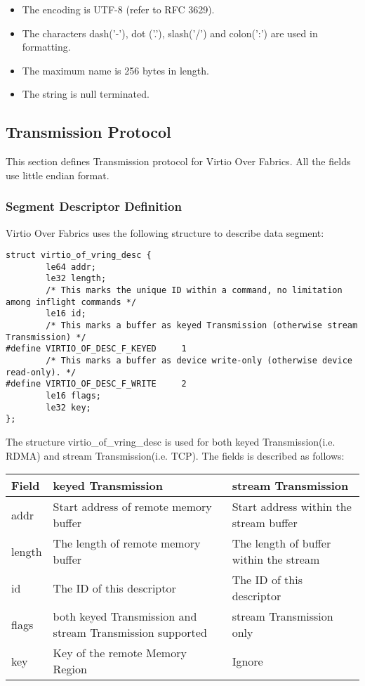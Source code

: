 \begin{itemize}
\item The encoding is UTF-8 (refer to RFC 3629).
\item The characters dash('-'), dot ('.'), slash('/') and colon(':') are used in formatting.
\item The maximum name is 256 bytes in length.
\item The string is null terminated.
\end{itemize}

\subsection{Transmission Protocol}\label{sec:Virtio Transport Options / Virtio Over Fabrics / Transmission Protocol}
This section defines Transmission protocol for Virtio Over Fabrics. All the fields use little endian format.

\subsubsection{Segment Descriptor Definition}\label{sec:Virtio Transport Options / Virtio Over Fabrics / Transmission Protocol / Segment Descriptor Definition}
Virtio Over Fabrics uses the following structure to describe data segment:

\begin{lstlisting}
struct virtio_of_vring_desc {
        le64 addr;
        le32 length;
        /* This marks the unique ID within a command, no limitation among inflight commands */
        le16 id;
        /* This marks a buffer as keyed Transmission (otherwise stream Transmission) */
#define VIRTIO_OF_DESC_F_KEYED     1
        /* This marks a buffer as device write-only (otherwise device read-only). */
#define VIRTIO_OF_DESC_F_WRITE     2
        le16 flags;
        le32 key;
};
\end{lstlisting}

The structure virtio_of_vring_desc is used for both keyed Transmission(i.e. RDMA) and stream Transmission(i.e. TCP). The fields is described as follows:

\begin{tabular}{ |l|l|l| }
\hline
Field & keyed Transmission & stream Transmission \\
\hline \hline
addr & Start address of remote memory buffer & Start address within the stream buffer \\
\hline
length & The length of remote memory buffer & The length of buffer within the stream \\
\hline
id & The ID of this descriptor & The ID of this descriptor \\
\hline
flags & both keyed Transmission and stream Transmission supported & stream Transmission only \\
\hline
key & Key of the remote Memory Region & Ignore \\
\hline
\end{tabular}

